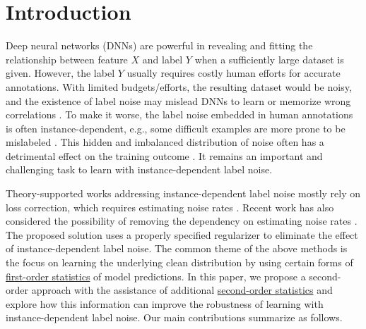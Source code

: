 \documentclass[final]{cvpr}
\begin{document}
\vspace{-10pt}
\section{Introduction}
Deep neural networks (DNNs) are powerful in revealing and fitting the relationship between feature $X$ and label $Y$ when a sufficiently large dataset is given. However, the label $Y$ usually requires costly human efforts for accurate annotations. With limited budgets/efforts, the resulting dataset would be noisy, and the existence of label noise may mislead DNNs to learn or memorize wrong correlations \cite{han2020sigua,han2020survey,wang2021learning,xia2021robust,zhang2016understanding}.
To make it worse, the label noise embedded in human annotations is often instance-dependent, e.g., some difficult examples are more prone to be mislabeled \cite{wang2021tackling}. This hidden and imbalanced distribution of noise often has a detrimental effect on the training outcome \cite{jiang2020beyond,liu2021importance}. It remains an important and challenging task to learn with instance-dependent label noise. 

Theory-supported works addressing instance-dependent label noise mostly rely on loss correction, which requires estimating noise rates \cite{xia2020parts}. Recent work has also considered the possibility of removing the dependency on estimating noise rates \cite{sieve2020}. The proposed solution uses a properly specified regularizer to eliminate the effect of instance-dependent label noise. The common theme of the above methods is the focus on learning the underlying clean distribution by using certain forms of \underline{first-order statistics} of model predictions. In this paper, we propose a second-order approach with the assistance of additional \underline{second-order statistics} and explore how this information can improve the robustness of learning with instance-dependent label noise.
Our main contributions summarize as follows. 
\end{document}
